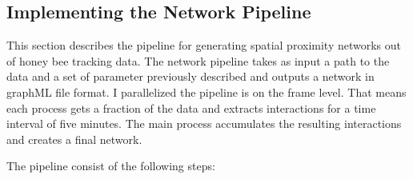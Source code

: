 \subsection{Implementing the Network Pipeline}

This section describes the pipeline for generating spatial proximity networks out of honey bee tracking data. The network pipeline takes as input a path to the data and a set of parameter previously described and outputs a network in graphML file format. I parallelized the pipeline is on the frame level. That means each process gets a fraction of the data and extracts interactions for a time interval of five minutes. The main process accumulates the resulting interactions and creates a final network.

The pipeline consist of the following steps:

